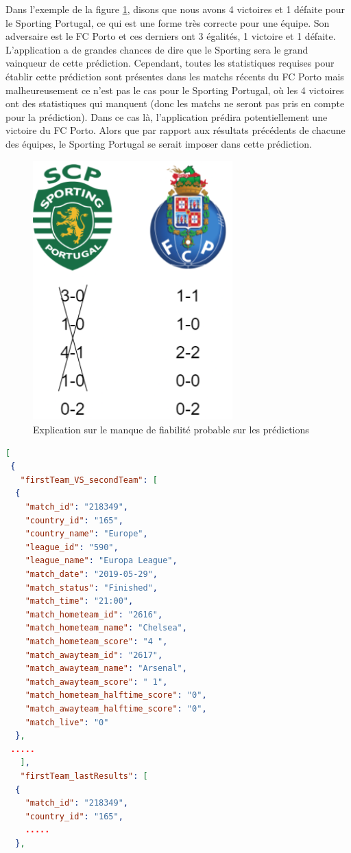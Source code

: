 \documentclass[a4paper,14pt]{extarticle}
\begin{document}
{Dans l'exemple de la figure \ref{fig:explicationStatsManquante}, disons que nous avons 4 victoires et 1 défaite pour le Sporting Portugal, ce qui est une forme très correcte pour une équipe. Son adversaire est le FC Porto et ces derniers ont 3 égalités, 1 victoire et 1 défaite. L'application a de grandes chances de dire que le Sporting sera le grand vainqueur de cette prédiction. Cependant, toutes les statistiques requises pour établir cette prédiction sont présentes dans les matchs récents du FC Porto mais malheureusement ce n'est pas le cas pour le Sporting Portugal, où les 4 victoires ont des statistiques qui manquent (donc les matchs ne seront pas pris en compte pour la prédiction). Dans ce cas là, l'application prédira potentiellement une victoire du FC Porto. Alors que par rapport aux résultats précédents de chacune des équipes, le Sporting Portugal se serait imposer dans cette prédiction.

\begin{figure}[H]
    \centering
    \includegraphics[height=10cm]{../img/explicationStatsManquante.png}
    \caption{Explication sur le manque de fiabilité probable sur les prédictions}
    \label{fig:explicationStatsManquante}
\end{figure}

\begin{lstlisting}[language=json, firstnumber=1, caption=Aperçu du JSON de l'endpoint H2H, captionpos=b, label=apercuJSON]
[
 {
   "firstTeam_VS_secondTeam": [
  {
    "match_id": "218349",
    "country_id": "165",
    "country_name": "Europe",
    "league_id": "590",
    "league_name": "Europa League",
    "match_date": "2019-05-29",
    "match_status": "Finished",
    "match_time": "21:00",
    "match_hometeam_id": "2616",
    "match_hometeam_name": "Chelsea",
    "match_hometeam_score": "4 ",
    "match_awayteam_id": "2617",
    "match_awayteam_name": "Arsenal",
    "match_awayteam_score": " 1",
    "match_hometeam_halftime_score": "0",
    "match_awayteam_halftime_score": "0",
    "match_live": "0"
  },
 .....
   ],
   "firstTeam_lastResults": [
  {
    "match_id": "218349",
    "country_id": "165",
    .....
  },
  

\end{lstlisting}}
\end{document}
